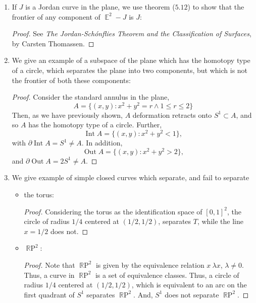 \documentclass{book}
\DeclareMathOperator*{\R}{\mathbb{R}}
\DeclareMathOperator*{\Int}{\text{Int}}
\DeclareMathOperator*{\Out}{\text{Out}}
\DeclareMathOperator*{\E}{\mathbb{E}}
\DeclareMathOperator*{\RP}{\R\text{P}}
\begin{document}
\begin{enumerate}[(1)]
    \item If $J$ is a Jordan curve in the plane, we use theorem ($5.12$) to show that the frontier of any component of $\E^2 - J$ is $J$: 
        \begin{proof} See \textit{The Jordan-Sch\'onflies Theorem and the Classification of Surfaces}, by Carsten Thomassen. 
        \end{proof}

    \item We give an example of a subspace of the plane which has the homotopy type of a circle, which separates the plane into two components, but which is not the frontier of both these components: 
        \begin{proof} Consider the standard annulus in the plane, 
            \[A = \{(x,y) : x^2 + y^2 = r \land 1 \leq r \leq 2 \}\]
            Then, as we have previously shown, $A$ deformation retracts onto $S^1 \subset A$, and so $A$ has the homotopy type of a circle. Further, 
            \[\Int A = \{(x,y) : x^2 + y^2 < 1\},\]
            with $\partial \Int A = S^1 \neq A$. In addition, 
            \[\Out A = \{(x,y) : x^2 +y^2 > 2\},\]
            and $\partial \Out A = 2S^1 \neq A$. 
        \end{proof}

    \item We give example of simple closed curves which separate, and fail to separate
        \begin{itemize}
            \item the torus: 
                \begin{proof} Considering the torus as the identification space of $[0,1]^2$, the circle of radius $1/4$ centered at $(1/2,1/2)$, separates $T$, while the line $x = 1/2$ does not. 
                \end{proof}

            \item $\RP^2$: 
                \begin{proof} Note that $\RP^2$ is given by the equivalence relation 
                    $x ~ \lambda x$, $\lambda\neq 0$. Thus, a curve in $\RP^2$ is a set of equivalence classes. Thus, a circle of radius $1/4$ centered at $(1/2,1/2)$, which is equivalent to an arc on the first quadrant of $S^1$ separates $\RP^2$. And, $S^1$ does not separate $\RP^2$. 
                \end{proof}

        \end{itemize}


\end{enumerate}
\end{document}
